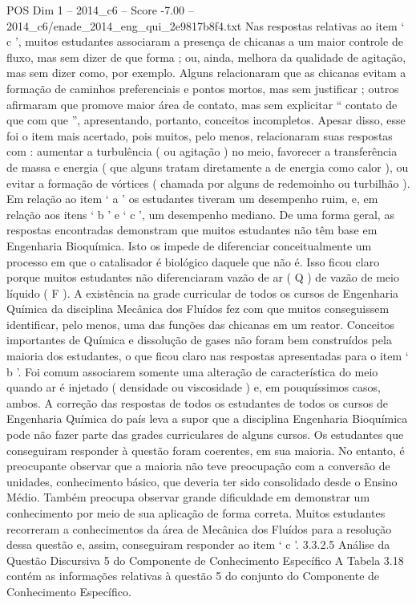 \begin{textsample}{POS Dim 1 – 2014\_c6 – Score -7.00 – 2014\_c6/enade\_2014\_eng\_qui\_2e9817b8f4.txt}
Nas respostas relativas ao item ‘ c ’, muitos estudantes associaram a presença de chicanas a um maior controle de fluxo, mas sem dizer de que forma ; ou, ainda, melhora da qualidade de agitação, mas sem dizer como, por exemplo.
Alguns relacionaram que as chicanas evitam a formação de caminhos preferenciais e pontos mortos, mas sem justificar ; outros afirmaram que promove maior área de contato, mas sem explicitar “ contato de que com que ”, apresentando, portanto, conceitos incompletos.
Apesar disso, esse foi o item mais acertado, pois muitos, pelo menos, relacionaram suas respostas com : aumentar a turbulência ( ou agitação ) no meio, favorecer a transferência de massa e energia ( que alguns tratam diretamente a de energia como calor ), ou evitar a formação de vórtices ( chamada por alguns de redemoinho ou turbilhão ).
Em relação ao item ‘ a ’ os estudantes tiveram um desempenho ruim, e, em relação aos itens ‘ b ’ e ‘ c ’, um desempenho mediano.
De uma forma geral, as respostas encontradas demonstram que muitos estudantes não têm base em Engenharia Bioquímica.
Isto os impede de diferenciar conceitualmente um processo em que o catalisador é biológico daquele que não é.
Isso ficou claro porque muitos estudantes não diferenciaram vazão de ar ( Q ) de vazão de meio líquido ( F ).
A existência na grade curricular de todos os cursos de Engenharia Química da disciplina Mecânica dos Fluídos fez com que muitos conseguissem identificar, pelo menos, uma das funções das chicanas em um reator.
Conceitos importantes de Química e dissolução de gases não foram bem construídos pela maioria dos estudantes, o que ficou claro nas respostas apresentadas para o item ‘ b ’.
Foi comum associarem somente uma alteração de característica do meio quando ar é injetado ( densidade ou viscosidade ) e, em pouquíssimos casos, ambos.
A correção das respostas de todos os estudantes de todos os cursos de Engenharia Química do país leva a supor que a disciplina Engenharia Bioquímica pode não fazer parte das grades curriculares de alguns cursos.
Os estudantes que conseguiram responder à questão foram coerentes, em sua maioria.
No entanto, é preocupante observar que a maioria não teve preocupação com a conversão de unidades, conhecimento básico, que deveria ter sido consolidado desde o Ensino Médio.
Também preocupa observar grande dificuldade em demonstrar um conhecimento por meio de sua aplicação de forma correta.
Muitos estudantes recorreram a conhecimentos da área de Mecânica dos Fluídos para a resolução dessa questão e, assim, conseguiram responder ao item ‘ c ’. 3.3.2.5 Análise da Questão Discursiva 5 do Componente de Conhecimento Específico A Tabela 3.18 contém as informações relativas à questão 5 do conjunto do Componente de Conhecimento Específico.

\end{textsample}
